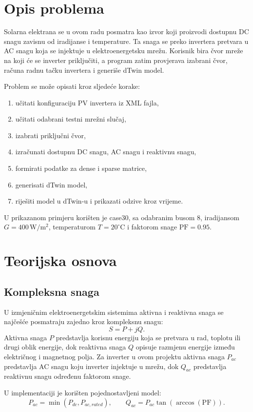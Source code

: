 \documentclass[12pt,a4paper]{article}
\begin{document}
\section{Opis problema}
Solarna elektrana se u ovom radu posmatra kao izvor koji proizvodi dostupnu DC snagu zavisnu od iradijanse i temperature. Ta snaga se preko invertera pretvara u AC snagu koja se injektuje u elektroenergetsku mrežu. Korisnik bira čvor mreže na koji će se inverter priključiti, a program zatim provjerava izabrani čvor, računa radnu tačku invertera i generiše dTwin model.

Problem se može opisati kroz sljedeće korake:
\begin{enumerate}
\item učitati konfiguraciju PV invertera iz XML fajla,
\item učitati odabrani testni mrežni slučaj,
\item izabrati priključni čvor,
\item izračunati dostupnu DC snagu, AC snagu i reaktivnu snagu,
\item formirati podatke za dense i sparse matrice,
\item generisati dTwin model,
\item riješiti model u dTwin-u i prikazati odzive kroz vrijeme.
\end{enumerate}

U prikazanom primjeru korišten je case30, sa odabranim busom 8, iradijansom $G=400\,\mathrm{W/m^2}$, temperaturom $T=20^\circ\mathrm{C}$ i faktorom snage $\mathrm{PF}=0.95$.

\section{Teorijska osnova}
\subsection{Kompleksna snaga}
U izmjeničnim elektroenergetskim sistemima aktivna i reaktivna snaga se najčešće posmatraju zajedno kroz kompleksnu snagu:
\[
S = P + jQ.
\]
Aktivna snaga $P$ predstavlja korisnu energiju koja se pretvara u rad, toplotu ili drugi oblik energije, dok reaktivna snaga $Q$ opisuje razmjenu energije između električnog i magnetnog polja. Za inverter u ovom projektu aktivna snaga $P_{ac}$ predstavlja AC snagu koju inverter injektuje u mrežu, dok $Q_{ac}$ predstavlja reaktivnu snagu određenu faktorom snage.

U implementaciji je korišten pojednostavljeni model:
\[
P_{ac}=\min(P_{dc},P_{ac,rated}),
\qquad
Q_{ac}=P_{ac}\tan(\arccos(\mathrm{PF})).
\]
\end{document}
